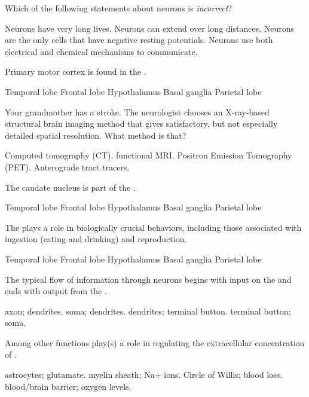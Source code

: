 \documentclass[answers]{exam}
\begin{document}
\begin{questions}
\newpage

\question Which of the following statements about neurons is \emph{incorrect}?
\begin{choices}
\choice Neurons have very long lives.
\choice Neurons can extend over long distances.
\correctchoice Neurons are the only cells that have negative resting potentials.
\choice Neurons use both electrical and chemical mechanisms to communicate.
\end{choices}

\question Primary motor cortex is found in the \fillin.
\begin{choices}
\choice Temporal lobe
\correctchoice Frontal lobe
\choice Hypothalamus
\choice Basal ganglia
\choice Parietal lobe
\end{choices}

\question Your grandmother has a stroke. The neurologist chooses an X-ray-based structural brain imaging method that gives satisfactory, but not especially detailed spatial resolution. What method is that?
\begin{choices}
\correctchoice Computed tomography (CT).
\choice functional MRI.
\choice Positron Emission Tomography (PET).
\choice Anterograde tract tracers.
\end{choices}

\question The caudate nucleus is part of the \fillin.
\begin{choices}
\choice Temporal lobe
\choice Frontal lobe
\choice Hypothalamus
\correctchoice Basal ganglia
\choice Parietal lobe
\end{choices}

\question The \fillin plays a role in biologically crucial behaviors, including those associated with ingestion (eating and drinking) and reproduction.
\begin{choices}
\choice Temporal lobe
\choice Frontal lobe
\correctchoice Hypothalamus
\choice Basal ganglia
\choice Parietal lobe
\end{choices}

\question The typical flow of information through neurons begins with input on the \fillin and ends with output from the \fillin.
\begin{choices}
\choice axon; dendrites.
\choice soma; dendrites.
\correctchoice dendrites; terminal button.
\choice terminal button; soma.
\end{choices}

\question Among other functions \fillin play(s) a role in regulating the extracellular concentration of \fillin.
\begin{choices}
\correctchoice astrocytes; glutamate.
\choice myelin sheath; Na+ ions.
\choice Circle of Willis; blood loss.
\choice blood/brain barrier; oxygen levels.
\end{choices}


\end{questions}
\end{document}
